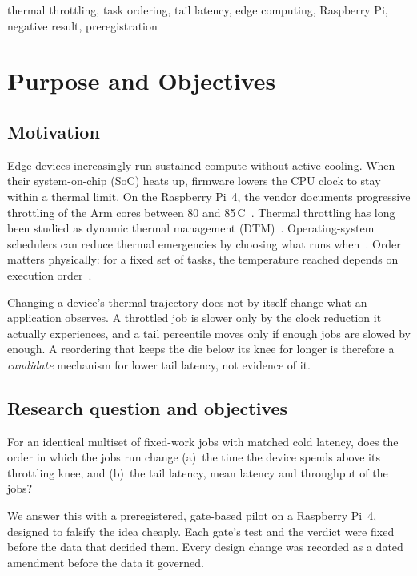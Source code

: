 \documentclass[conference,a4paper]{IEEEtran}
\newcommand{\degC}{\,\textdegree{}C}
\begin{document}
\begin{IEEEkeywords}
thermal throttling, task ordering, tail latency, edge computing, Raspberry Pi, negative result, preregistration
\end{IEEEkeywords}

\section{Purpose and Objectives}
\subsection{Motivation}
Edge devices increasingly run sustained compute without active cooling. When their system-on-chip (SoC) heats up,
firmware lowers the CPU clock to stay within a thermal limit. On the Raspberry Pi~4, the vendor documents
progressive throttling of the Arm cores between 80 and 85\degC{}~\cite{rpi-thermal}. Thermal throttling has long
been studied as dynamic thermal management (DTM)~\cite{brooks2001,skadron2003}. Operating-system schedulers can
reduce thermal emergencies by choosing what runs when~\cite{choi2007,yang2008,coskun2008}. Order matters
physically: for a fixed set of tasks, the temperature reached depends on execution order~\cite{chrobak2008}.

Changing a device's thermal trajectory does not by itself change what an application observes. A throttled job is
slower only by the clock reduction it actually experiences, and a tail percentile moves only if enough jobs are
slowed by enough. A reordering that keeps the die below its knee for longer is therefore a \emph{candidate}
mechanism for lower tail latency, not evidence of it.

\subsection{Research question and objectives}
For an identical multiset of fixed-work jobs with matched cold latency, does the order
in which the jobs run change (a)~the time the device spends above its throttling knee, and (b)~the tail latency,
mean latency and throughput of the jobs?

We answer this with a preregistered, gate-based pilot on a Raspberry Pi~4, designed to falsify the idea cheaply.
Each gate's test and the verdict were fixed before the data that decided them. Every design change was recorded
as a dated amendment before the data it governed.
\end{document}
